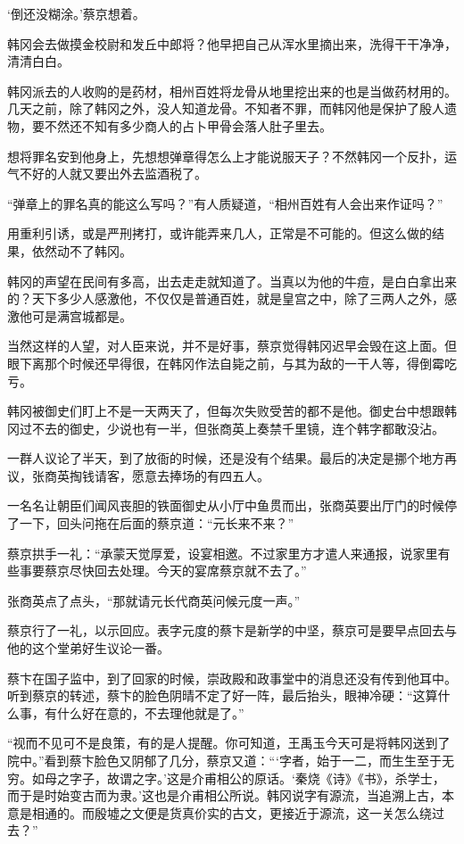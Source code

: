 ‘倒还没糊涂。’蔡京想着。

韩冈会去做摸金校尉和发丘中郎将？他早把自己从浑水里摘出来，洗得干干净净，清清白白。

韩冈派去的人收购的是药材，相州百姓将龙骨从地里挖出来的也是当做药材用的。几天之前，除了韩冈之外，没人知道龙骨。不知者不罪，而韩冈他是保护了殷人遗物，要不然还不知有多少商人的占卜甲骨会落人肚子里去。

想将罪名安到他身上，先想想弹章得怎么上才能说服天子？不然韩冈一个反扑，运气不好的人就又要出外去监酒税了。

“弹章上的罪名真的能这么写吗？”有人质疑道，“相州百姓有人会出来作证吗？”

用重利引诱，或是严刑拷打，或许能弄来几人，正常是不可能的。但这么做的结果，依然动不了韩冈。

韩冈的声望在民间有多高，出去走走就知道了。当真以为他的牛痘，是白白拿出来的？天下多少人感激他，不仅仅是普通百姓，就是皇宫之中，除了三两人之外，感激他可是满宫城都是。

当然这样的人望，对人臣来说，并不是好事，蔡京觉得韩冈迟早会毁在这上面。但眼下离那个时候还早得很，在韩冈作法自毙之前，与其为敌的一干人等，得倒霉吃亏。

韩冈被御史们盯上不是一天两天了，但每次失败受苦的都不是他。御史台中想跟韩冈过不去的御史，少说也有一半，但张商英上奏禁千里镜，连个韩字都敢没沾。

一群人议论了半天，到了放衙的时候，还是没有个结果。最后的决定是挪个地方再议，张商英掏钱请客，愿意去捧场的有四五人。

一名名让朝臣们闻风丧胆的铁面御史从小厅中鱼贯而出，张商英要出厅门的时候停了一下，回头问拖在后面的蔡京道：“元长来不来？”

蔡京拱手一礼：“承蒙天觉厚爱，设宴相邀。不过家里方才遣人来通报，说家里有些事要蔡京尽快回去处理。今天的宴席蔡京就不去了。”

张商英点了点头，“那就请元长代商英问候元度一声。”

蔡京行了一礼，以示回应。表字元度的蔡卞是新学的中坚，蔡京可是要早点回去与他的这个堂弟好生议论一番。

蔡卞在国子监中，到了回家的时候，崇政殿和政事堂中的消息还没有传到他耳中。听到蔡京的转述，蔡卞的脸色阴晴不定了好一阵，最后抬头，眼神冷硬：“这算什么事，有什么好在意的，不去理他就是了。”

“视而不见可不是良策，有的是人提醒。你可知道，王禹玉今天可是将韩冈送到了院中。”看到蔡卞脸色又阴郁了几分，蔡京又道：“‘字者，始于一二，而生生至于无穷。如母之字子，故谓之字。’这是介甫相公的原话。‘秦烧《诗》《书》，杀学士，而于是时始变古而为隶。’这也是介甫相公所说。韩冈说字有源流，当追溯上古，本意是相通的。而殷墟之文便是货真价实的古文，更接近于源流，这一关怎么绕过去？”


